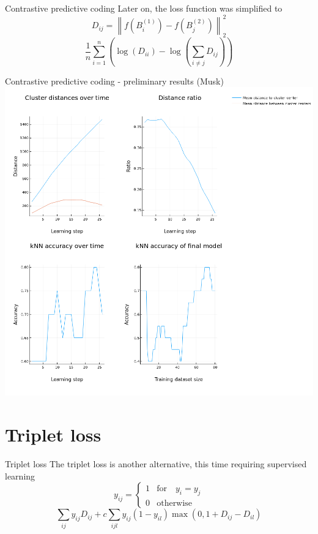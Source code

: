 \documentclass[10pt]{beamer}
\begin{document}
\begin{frame}{Contrastive predictive coding}
	Later on, the loss function was simplified to
	\[ D_{ij} = \left\lVert f \left( B_i^{(1)} \right) - f \left( B_j^{(2)} \right) \right\rVert_2^2 \]
	\[ \frac{1}{n} \sum_{i = 1}^n \left( \log \left( D_{ii} \right) - \log \left( \sum_{i \neq j} D_{ij} \right) \right) \]
\end{frame}

\begin{frame}{Contrastive predictive coding - preliminary results (Musk)}
	\centering
	\includegraphics[width=0.7\pagewidth]{images/CPC.png}
\end{frame}

\section{Triplet loss}

\begin{frame}{Triplet loss}
	The triplet loss is another alternative, this time requiring supervised learning
	\[ y_{ij} =
\begin{cases}
	1 &\text{for} \quad y_i = y_j \\
	0 &\text{otherwise}
\end{cases}
\]
\[ \sum_{ij} y_{ij} D_{ij} + c \sum_{ijl} y_{ij} \left( 1 - y_{il} \right) \max \left( 0, 1 + D_{ij} - D_{il} \right) \]
\end{frame}
\end{document}
